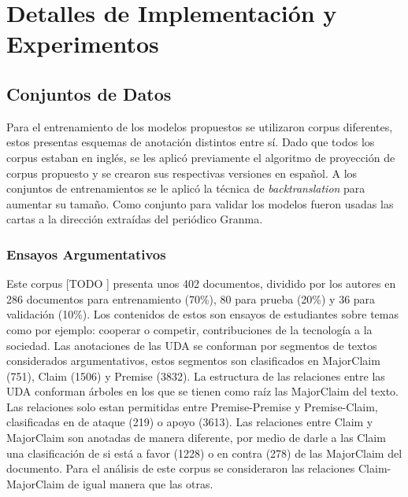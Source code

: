 \chapter{Detalles de Implementación y Experimentos}\label{chapter:implementation}


\section{Conjuntos de Datos}

Para el entrenamiento de los modelos propuestos se utilizaron corpus diferentes, estos
presentas esquemas de anotación distintos entre sí. Dado que todos los corpus estaban en inglés, 
se les aplicó previamente el algoritmo de proyección de corpus propuesto y se crearon sus respectivas
versiones en español. A los conjuntos de entrenamientos se le aplicó la técnica de \emph{backtranslation}
para aumentar su tamaño. Como conjunto para validar los modelos fueron usadas las cartas a la dirección
extraídas del periódico Granma.

\subsection{Ensayos Argumentativos}\label{corpus:persuasive_essays}

Este corpus [TODO \cite{CORPUS PAPER}] presenta unos 402 documentos, dividido por los autores en 286 documentos para entrenamiento (70\%), 
80 para prueba (20\%) y 36 para validación (10\%). Los contenidos de estos son ensayos de estudiantes sobre temas
como por ejemplo: cooperar o competir, contribuciones de la tecnología a la sociedad.
Las anotaciones de las UDA se conforman por segmentos 
de textos considerados argumentativos, estos segmentos son clasificados en MajorClaim (751), Claim (1506) y Premise (3832).
La estructura de las relaciones entre las UDA conforman árboles en los que se tienen como raíz las 
MajorClaim del texto. Las relaciones solo estan permitidas entre Premise-Premise y Premise-Claim, clasificadas
en de ataque (219) o apoyo (3613). Las relaciones entre Claim y MajorClaim son anotadas de manera diferente, por medio de 
darle a las Claim una clasificación de si está a favor (1228) o en contra (278) de las MajorClaim del documento.
Para el análisis de este corpus se consideraron las relaciones Claim-MajorClaim de igual manera que las otras.

